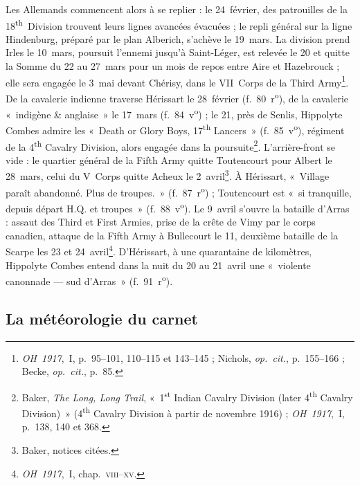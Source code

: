 Les Allemands commencent alors à se replier : le 24~février, des patrouilles de la 18\textsuperscript{th}~Division trouvent leurs lignes avancées évacuées ; le repli général sur la ligne Hindenburg, préparé par le plan Alberich, s'achève le 19~mars. La division prend Irles le 10~mars, poursuit l'ennemi jusqu'à Saint-Léger, est relevée le 20 et quitte la Somme du 22 au 27~mars pour un mois de repos entre Aire et Hazebrouck ; elle sera engagée le 3~mai devant Chérisy, dans le VII~Corps de la Third Army\footnote{\textit{OH~1917},~I, p.~95--101, 110--115 et 143--145 ; Nichols, \textit{op.~cit.}, p.~155--166 ; Becke, \textit{op.~cit.}, p.~85.}. De la cavalerie indienne traverse Hérissart le 28~février (f.~80~r\textsuperscript{o}), de la cavalerie «~indigène \& anglaise~» le 17~mars (f.~84~v\textsuperscript{o}) ; le 21, près de Senlis, Hippolyte Combes admire les «~Death or Glory Boys, 17\textsuperscript{th} Lancers~» (f.~85~v\textsuperscript{o}), régiment de la 4\textsuperscript{th} Cavalry Division, alors engagée dans la poursuite\footnote{Baker, \textit{The Long, Long Trail}, «~1\textsuperscript{st} Indian Cavalry Division (later 4\textsuperscript{th} Cavalry Division)~» (4\textsuperscript{th} Cavalry Division à partir de novembre 1916) ; \textit{OH~1917},~I, p.~138, 140 et 368.}. L'arrière-front se vide : le quartier général de la Fifth Army quitte Toutencourt pour Albert le 28~mars, celui du V~Corps quitte Acheux le 2~avril\footnote{Baker, notices citées.}. À Hérissart, «~Village paraît abandonné. Plus de troupes.~» (f.~87~r\textsuperscript{o}) ; Toutencourt est «~si tranquille, depuis départ H.Q. et troupes~» (f.~88~v\textsuperscript{o}). Le 9~avril s'ouvre la bataille d'Arras : assaut des Third et First Armies, prise de la crête de Vimy par le corps canadien, attaque de la Fifth Army à Bullecourt le 11, deuxième bataille de la Scarpe les 23 et 24~avril\footnote{\textit{OH~1917},~I, chap.~\textsc{viii}--\textsc{xv}.}. D'Hérissart, à une quarantaine de kilomètres, Hippolyte Combes entend dans la nuit du 20 au 21~avril une «~violente canonnade --- sud d'Arras~» (f.~91~r\textsuperscript{o}).

\subsection{La météorologie du carnet}

